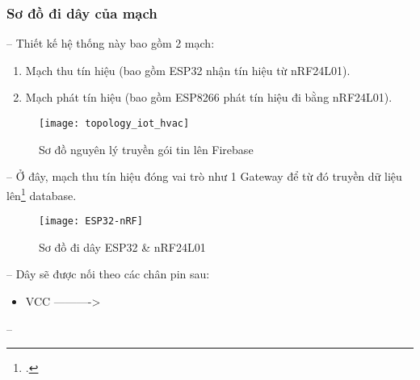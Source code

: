 \subsubsection{Sơ đồ đi dây của mạch}
-- Thiết kế hệ thống này bao gồm 2 mạch:
\begin{enumerate}
	\item Mạch thu tín hiệu (bao gồm ESP32 nhận tín hiệu từ nRF24L01).
	\item Mạch phát tín hiệu (bao gồm ESP8266 phát tín hiệu đi bằng nRF24L01).
\end{enumerate}
\begin{figure}[H]
	\centering
	\texttt{[image: topology\_iot\_hvac]}
	\caption{Sơ đồ nguyên lý truyền gói tin lên Firebase}
\end{figure}

-- Ở đây, mạch thu tín hiệu đóng vai trò như 1 Gateway để từ đó truyền dữ liệu lên\footcite{einstein} database.
\begin{figure}[H]
	\centering
	\texttt{[image: ESP32-nRF]}
	\caption{Sơ đồ đi dây ESP32 \& nRF24L01}
\end{figure}

-- Dây sẽ được nối theo các chân pin sau:
\begin{itemize}
	\item VCC ----------> 
\end{itemize}
-- 






